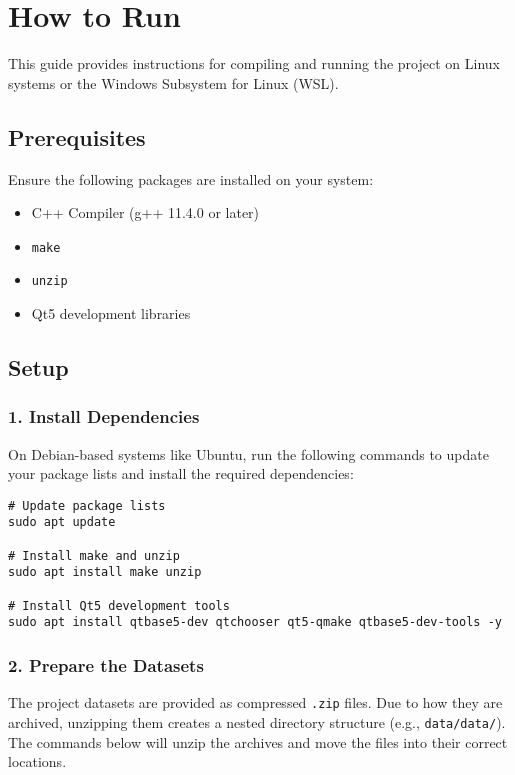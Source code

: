 \section{How to Run}

This guide provides instructions for compiling and running the project on Linux systems or the Windows Subsystem for Linux (WSL).

\subsection{Prerequisites}

Ensure the following packages are installed on your system:
\begin{itemize}
    \item C++ Compiler (g++ 11.4.0 or later)
    \item \texttt{make}
    \item \texttt{unzip}
    \item Qt5 development libraries
\end{itemize}

\subsection{Setup}

\subsubsection{1. Install Dependencies}

On Debian-based systems like Ubuntu, run the following commands to update your package lists and install the required dependencies:

\begin{verbatim}
# Update package lists
sudo apt update

# Install make and unzip
sudo apt install make unzip

# Install Qt5 development tools
sudo apt install qtbase5-dev qtchooser qt5-qmake qtbase5-dev-tools -y 
\end{verbatim}

\subsubsection{2. Prepare the Datasets}

The project datasets are provided as compressed \texttt{.zip} files. Due to how they are archived, unzipping them creates a nested directory structure (e.g., \texttt{data/data/}). The commands below will unzip the archives and move the files into their correct locations.


